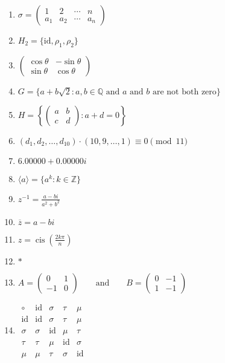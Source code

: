 \documentclass[oneside,10pt,]{article}
\newcommand{\identity}{\mathrm{id}}
\newcommand{\cis}{\operatorname{cis}}
\begin{document}
\begin{enumerate}
\item{}\(\displaystyle \sigma = \begin{pmatrix} 1 & 2 & \cdots & n \\ a_1 & a_2 & \cdots & a_n \end{pmatrix}\)%
\item{}\(\displaystyle H_2 = \{ \identity, \rho_1, \rho_2 \}\)%
\item{}\(\displaystyle \begin{pmatrix} \cos \theta & -\sin \theta \\ \sin \theta & \cos \theta \end{pmatrix}\)%
\item{}\(\displaystyle G = \{ a + b \sqrt{2} : a, b \in {\mathbb Q} \text{ and } a \text{ and } b \text{ are not both zero} \}\)%
\item{}\(\displaystyle H = \left\{ \begin{pmatrix} a & b \\ c & d \end{pmatrix} : a + d = 0 \right\}\)%
\item{}\(\displaystyle (d_1, d_2, \ldots, d_{10} ) \cdot (10, 9, \ldots, 1 ) \equiv 0 \pmod{11}\)%
\item{}\(\displaystyle 6.00000+0.00000i\)%
\item{}\(\displaystyle \langle a \rangle = \{ a^k : k \in {\mathbb Z} \}\)%
\item{}\(\displaystyle z^{-1} = \frac{a-bi}{ a^2 + b^2 }\)%
\item{}\(\displaystyle \overline{z} = a- bi\)%
\item{}\(\displaystyle z = \cis\left( \frac{2 k \pi}{n } \right)\)%
\item{}\(\displaystyle \ast\)%
\item{}\(\displaystyle A = \begin{pmatrix} 0 & 1 \\ -1 & 0 \end{pmatrix} \qquad \text{and} \qquad B = \begin{pmatrix} 0 & -1 \\ 1 & -1 \end{pmatrix}\)%
\item{}\(\displaystyle \begin{array}{c|cccc} \circ & \identity & \sigma & \tau & \mu \\ \hline \identity & \identity & \sigma & \tau & \mu \\ \sigma & \sigma & \identity & \mu & \tau \\ \tau & \tau & \mu & \identity & \sigma \\ \mu & \mu & \tau & \sigma & \identity \end{array}\)%

\end{enumerate}
\end{document}
